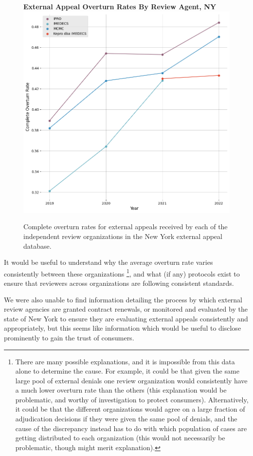\documentclass[12pt, a4paper,twoside,parskip=full]{report}
\theoremstyle{plain} %
\theoremstyle{definition} %
\theoremstyle{remark} %
\numberwithin{equation}{chapter}
\begin{document}
		\begin{figure}[h!]
			\centering
			\textbf{External Appeal Overturn Rates By Review Agent, NY}
			\includegraphics[width=.8\textwidth]{images/nys_external/external_appeal_overturn_rates_by_review_org.png}
			\caption{Complete overturn rates for external appeals received by each of the independent review organizations in the New York external appeal database.}
			\label{nyexternalappealoverturnratebyreviewagentovertime}
		\end{figure}
		\clearpage
	
		It would be useful to understand why the average overturn rate varies consistently between these organizations \footnote{There are many possible explanations, and it is impossible from this data alone to determine the cause. For example, it could be that given the same large pool of external denials one review organization would consistently have a much lower overturn rate than the others (this explanation would be problematic, and worthy of investigation to protect consumers). Alternatively, it could be that the different organizations would agree on a large fraction of adjudication decisions if they were given the same pool of denials, and the cause of the discrepancy instead has to do with which population of cases are getting distributed to each organization (this would not necessarily be problematic, though might merit explanation).}, and what (if any) protocols exist to ensure that reviewers across organizations are following consistent standards.
		
		We were also unable to find information detailing the process by which external review agencies are granted contract renewals, or monitored and evaluated by the state of New York to ensure they are evaluating external appeals consistently and appropriately, but this seems like information which would be useful to disclose prominently to gain the trust of consumers.
		
\end{document}
